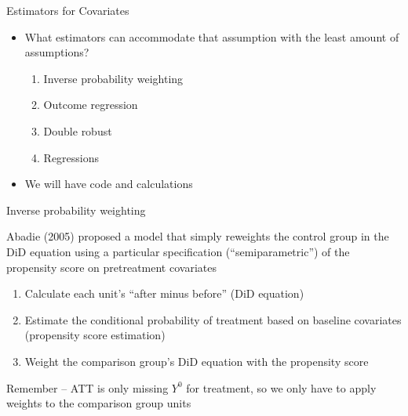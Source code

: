\documentclass{beamer}
\begin{document}
\begin{frame}{Estimators for Covariates}

\begin{itemize}

\item What estimators can accommodate that assumption with the least amount of assumptions?
	\begin{enumerate}
	\item Inverse probability weighting
	\item Outcome regression
	\item Double robust
	\item Regressions
	\end{enumerate}
\item We will have code and calculations
\end{itemize}

\end{frame}







\begin{frame}{Inverse probability weighting}


 Abadie (2005) proposed a model that simply reweights the control group in the DiD equation using a particular specification (``semiparametric'') of the propensity score on pretreatment covariates
 
	\begin{enumerate}
	\item Calculate each unit's ``after minus before'' (DiD equation)
	\item Estimate the conditional probability of treatment based on baseline covariates (propensity score estimation)
	\item Weight the comparison group's DiD equation with the propensity score 
	\end{enumerate}

Remember -- ATT is only missing $Y^0$ for treatment, so we only have to apply weights to the comparison group units

\end{frame}
\end{document}
